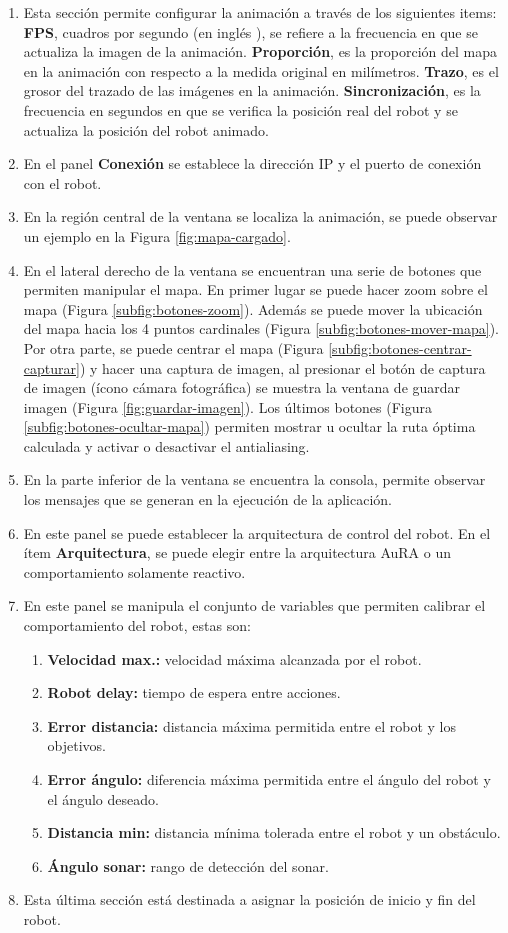 \documentclass[11pt,twoside,A5]{article}
\newcommand{\reffigure}[1]{Figura \ref{#1}}
\newcommand{\refpfigure}[1]{(\reffigure{#1})}
\begin{document}
\begin{enumerate}
\item Esta sección permite configurar la animación 
a través de los siguientes items: \textbf{FPS}, cuadros por segundo (en inglés ), 
se refiere a la frecuencia en que se actualiza la imagen de la animación. \textbf{Proporción}, es la proporción del mapa en 
la animación con respecto a la medida original en milímetros. \textbf{Trazo}, es el grosor del trazado de las imágenes en la 
animación. \textbf{Sincronización}, es la frecuencia en segundos en que se verifica la posición real del robot y se actualiza la 
posición del robot animado.
\item En el panel \textbf{Conexión} se establece la dirección IP y el puerto de conexión con el robot.
\item En la región central de la ventana se localiza la animación, se puede observar un ejemplo en la \reffigure{fig:mapa-cargado}. 
\item En el lateral derecho de la ventana se encuentran una serie de botones que permiten manipular el mapa.
 En primer lugar 
se puede hacer zoom sobre el mapa \refpfigure{subfig:botones-zoom}. Además se puede mover la ubicación del mapa hacia los 4 puntos 
cardinales \refpfigure{subfig:botones-mover-mapa}. Por otra parte, se puede centrar el mapa \refpfigure{subfig:botones-centrar-capturar} y hacer una captura de imagen, al presionar el botón de captura de imagen (ícono cámara fotográfica) se
muestra la ventana de guardar imagen \refpfigure{fig:guardar-imagen}. Los últimos botones \refpfigure{subfig:botones-ocultar-mapa} permiten mostrar u ocultar
la ruta óptima calculada y activar o desactivar el antialiasing.
\item En la parte inferior de la ventana se encuentra la consola, permite observar los mensajes que se generan en la ejecución
de la aplicación.
\item En este panel se puede establecer la arquitectura de control del robot.
En el ítem \textbf{Arquitectura}, se puede elegir entre la arquitectura AuRA o un comportamiento solamente reactivo.
\item En este panel se manipula el conjunto de variables que permiten calibrar el comportamiento del robot, estas son:
\begin{enumerate}
\item \textbf{Velocidad max.:} velocidad máxima alcanzada por el robot.
\item \textbf{Robot delay:} tiempo de espera entre acciones.
\item \textbf{Error distancia:} distancia máxima permitida entre el robot y los objetivos.
\item \textbf{Error ángulo:} diferencia máxima permitida entre el ángulo del robot y el ángulo deseado.
\item \textbf{Distancia min:} distancia mínima tolerada entre el robot y un obstáculo.
\item \textbf{Ángulo sonar:} rango de detección del sonar.
\end{enumerate}
\item Esta última sección está destinada a asignar la posición de inicio y fin del robot.
\end{enumerate} 
\end{document}
